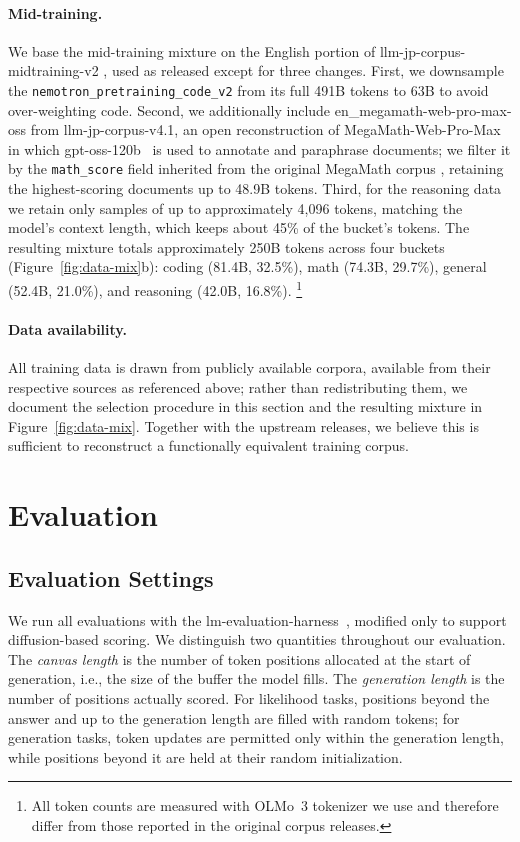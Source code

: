 \documentclass[11pt, a4paper]{style}
\begin{document}
\paragraph{Mid-training.}
We base the mid-training mixture on the English portion of llm-jp-corpus-midtraining-v2 \citep{kodama2026llmjpmid}, used as released except for three changes.
First, we downsample the \texttt{nemotron\_\allowbreak pretraining\_\allowbreak code\_\allowbreak v2} from its full 491B tokens to 63B to avoid over-weighting code.
Second, we additionally include en\_megamath-web-pro-max-oss from llm-jp-corpus-v4.1, an open reconstruction of MegaMath-Web-Pro-Max \citep{wang2025megamath} in which gpt-oss-120b~\citep{openai2025gptoss} is used to annotate and paraphrase documents; we filter it by the \texttt{math\_score} field inherited from the original MegaMath corpus \citep{zhou2025megamath}, retaining the highest-scoring documents up to 48.9B tokens.
Third, for the reasoning data we retain only samples of up to approximately 4{,}096 tokens, matching the model's context length, which keeps about 45\% of the bucket's tokens.
The resulting mixture totals approximately 250B tokens across four buckets (Figure~\ref{fig:data-mix}b): coding (81.4B, 32.5\%), math (74.3B, 29.7\%), general (52.4B, 21.0\%), and reasoning (42.0B, 16.8\%).
\footnote{All token counts are measured with OLMo~3 tokenizer we use and therefore differ from those reported in the original corpus releases.}

\paragraph{Data availability.}
All training data is drawn from publicly available corpora, available from their respective sources as referenced above; rather than redistributing them, we document the selection procedure in this section and the resulting mixture in Figure~\ref{fig:data-mix}.
Together with the upstream releases, we believe this is sufficient to reconstruct a functionally equivalent training corpus.



\section{Evaluation}
\subsection{Evaluation Settings}
We run all evaluations with the lm-evaluation-harness~\citep{gao2024evalharness}, modified only to support diffusion-based scoring.
We distinguish two quantities throughout our evaluation. The \emph{canvas length} is the number of token positions allocated at the start of generation, i.e., the size of the buffer the model fills. The \emph{generation length} is the number of positions actually scored. For likelihood tasks, positions beyond the answer and up to the generation length are filled with random tokens; for generation tasks, token updates are permitted only within the generation length, while positions beyond it are held at their random initialization.
\end{document}
